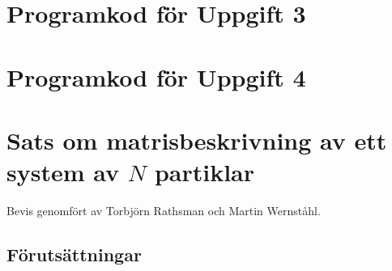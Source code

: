 \documentclass[12pt,a4paper]{article}
\begin{document}
	\begin{appendix}
	
		
		
		\section{Programkod för Uppgift 3}
			
			\begin{framed}
				
			\end{framed}
		
		\section{Programkod för Uppgift 4}
			
			\begin{framed}
				
			\end{framed}
	
	\newpage
	
\section{Sats om matrisbeskrivning av ett system av $N$ partiklar}
	
	\setcounter{equation}{0}
	
	Bevis genomfört av Torbjörn Rathsman och Martin Wernståhl.
	
	\subsection{Förutsättningar}
		\label{assumptions}
		

\end{appendix}
\end{document}
